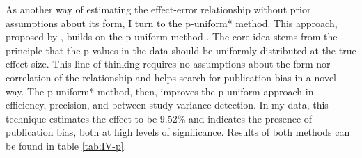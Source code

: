 
As another way of estimating the effect-error relationship without prior assumptions about its form, I turn to the p-uniform* method. This approach, proposed by \cite{vanAert2021puni}, builds on the p-uniform method \citep{van2016conducting}. The core idea stems from the principle that the p-values in the data should be uniformly distributed at the true effect size. This line of thinking requires no assumptions about the form nor correlation of the relationship and helps search for publication bias in a novel way. The p-uniform* method, then, improves the p-uniform approach in efficiency, precision, and between-study variance detection. In my data, this technique estimates the effect to be 9.52\% and indicates the presence of publication bias, both at high levels of significance. Results of both methods can be found in table \autoref{tab:IV-p}. 

